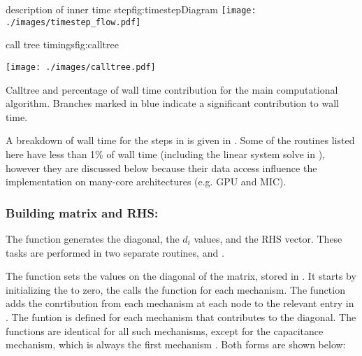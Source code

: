 \begin{myfigure}{description of inner time step}{fig:timestepDiagram}
\centering
\texttt{[image: ./images/timestep\_flow.pdf]}
\end{myfigure}

\begin{myfigure}{call tree timings}{fig:calltree}
\begin{center}
\texttt{[image: ./images/calltree.pdf]}
\end{center}
Calltree and percentage of wall time contribution for the main computational algorithm. Branches marked in blue indicate a significant contribution to wall time.
\end{myfigure}

A breakdown of wall time for the steps in  is given in . Some of the routines listed here have less than 1\% of wall time (including the linear system solve in ), however they are discussed below because their data access influence the implementation on many-core architectures (e.g. GPU and MIC).
\subsubsection{Building matrix and RHS: }
\label{sec:matrix_rhs}
The function  generates the diagonal, the $d_i$ values, and the RHS vector. These tasks are performed in two separate routines,  and .

The  function sets the values on the diagonal of the matrix, stored in . It starts by initializing the  to zero, the calls the  function for each mechanism. The  function adds the conrtibution from each mechanism at each node to the relevant entry in .
The  funtion is defined for each mechanism that contributes to the diagonal.
The  functions are identical for all such mechanisms, except for the capacitance mechanism, which is always the first mechanism .
Both forms are shown below:

